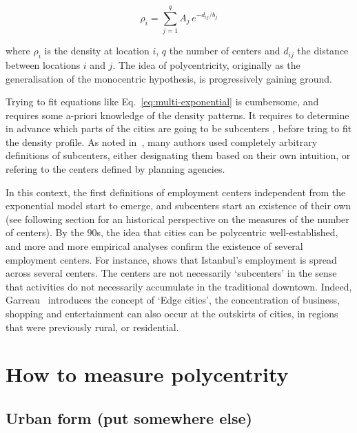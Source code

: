 \begin{equation}
    \rho_i = \sum_{j=1}^{q} A_j\,e^{-d_{ij}/b_j}
    \label{eq:multi-exponential}
\end{equation}

where $\rho_i$ is the density at location $i$, $q$ the number of centers and
$d_{ij}$ the distance between locations $i$ and $j$. The idea of polycentricity,
originally as the generalisation of the monocentric hypothesis, is progressively
gaining ground. 

Trying to fit equations like Eq.~\ref{eq:multi-exponential} is
cumbersome, and requires some a-priori knowledge of the density patterns. It
requires to determine in advance which parts of the cities are going to be
subcenters , before tring to fit the density profile. As noted
in~\cite{Giuliano:1991}, many authors used completely arbitrary definitions of
subcenters, either designating them based on their own intuition, or refering to
the centers defined by planning agencies. 

In this context, the first definitions of employment centers independent from
the exponential model start to emerge, and subcenters start an existence of
their own (see following section for an historical perspective on the measures
of the number of centers). By the $90$s, the idea that cities can be
polycentric well-established, and more and more empirical analyses confirm the
existence of several employment centers.  For instance, \cite{Dokmeci:1994}
shows that Istanbul's employment is spread across several centers. The centers
are not necessarily `subcenters' in the sense that activities do not necessarily
accumulate in the traditional downtown.  Indeed, Garreau~\cite{Garreau:1991}
introduces the concept of `Edge cities', the concentration of business, shopping
and entertainment can also occur at the outskirts of cities, in regions that
were previously rural, or residential.\\

\section{How to measure polycentrity}
\label{sec:how_to_measure_polycentrity}

\subsection{Urban form (put somewhere else)}
\label{sub:urban_form_put_somewhere_else_}


